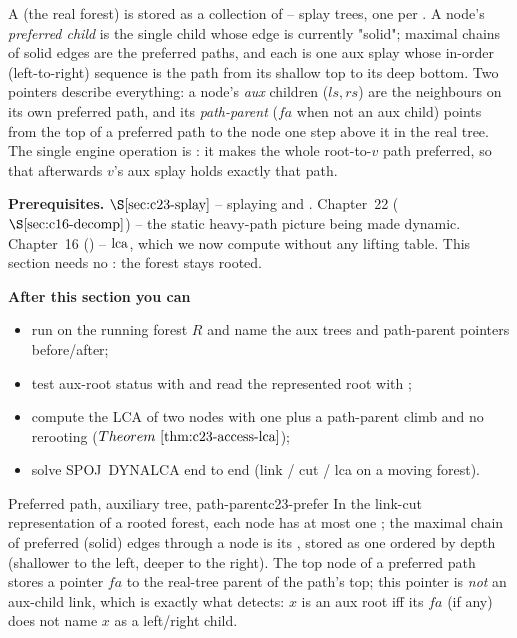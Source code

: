 \begin{topicintro}
A  (the real forest) is stored as a collection of
 -- splay trees, one per . A node's
\emph{preferred child} is the single child whose edge is currently "solid"; maximal
chains of solid edges are the preferred paths, and each is one aux splay whose
in-order (left-to-right) sequence is the path from its shallow top to its deep
bottom. Two pointers describe everything: a node's \emph{aux} children
(\(\mathit{ls},\mathit{rs}\)) are the neighbours on its own preferred path, and its
\emph{path-parent} (\(\mathit{fa}\) when not an aux child) points from the top of a
preferred path to the node one step above it in the real tree. The single engine
operation is : it makes the whole root-to-\(v\) path preferred, so
that afterwards \(v\)'s aux splay holds exactly that path.

\textbf{Prerequisites.} \(\secref{c23-splay}\) -- splaying and .
Chapter~22 (\(\secref{c16-decomp}\)) -- the static heavy-path picture being made
dynamic. Chapter~16 () -- \(\operatorname{lca}\), which we now compute without any
lifting table. This section needs no : the forest stays rooted.

\textbf{After this section you can}
\begin{itemize}[nosep]
  \item run  on the running forest \(R\) and name the aux trees and
        path-parent pointers before/after; \hfill{}
  \item test aux-root status with  and read the represented root
        with ; \hfill{}
  \item compute the LCA of two nodes with one  plus a path-parent
        climb and no rerooting (\(\thmref{c23-access-lca}\)); \hfill{}
  \item solve SPOJ~DYNALCA end to end (link / cut / lca on a moving forest). \hfill{}
\end{itemize}
\end{topicintro}

\begin{definition}{Preferred path, auxiliary tree, path-parent}{c23-prefer}
In the link-cut representation of a rooted forest, each node has at most one
; the maximal chain of preferred (solid) edges through a node
is its , stored as one  ordered by
depth (shallower to the left, deeper to the right). The top node of a preferred
path stores a  pointer \(\mathit{fa}\) to the real-tree parent of
the path's top; this pointer is \emph{not} an aux-child link, which is exactly what
 detects: \(x\) is an aux root iff its \(\mathit{fa}\) (if any)
does not name \(x\) as a left/right child.
\end{definition}

